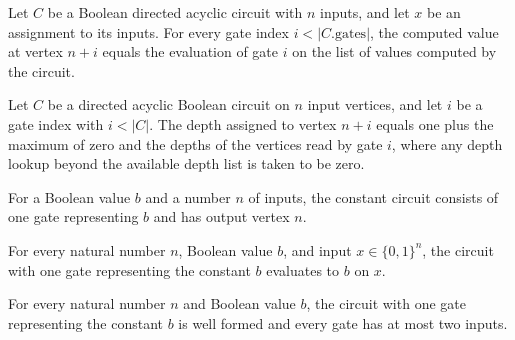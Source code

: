 \begin{theorem}
\label{BoolCircuit.DAGCircuit.values_getD_gate}
\leanok
{}
Let $C$ be a Boolean directed acyclic circuit with $n$ inputs, and let $x$ be an
assignment to its inputs. For every gate index $i<|C.\text{gates}|$, the computed value
at vertex $n+i$ equals the evaluation of gate $i$ on the list of values computed by the
circuit.
\end{theorem}

\begin{theorem}
\label{BoolCircuit.DAGCircuit.depthAt_gate}
\leanok
{}
Let $C$ be a directed acyclic Boolean circuit on $n$ input vertices, and let $i$ be a
gate index with $i<|C|$. The depth assigned to vertex $n+i$ equals one plus the maximum
of zero and the depths of the vertices read by gate $i$, where any depth lookup beyond
the available depth list is taken to be zero.
\end{theorem}

\begin{definition}
\label{BoolCircuit.constCircuit}
\leanok
{}
For a Boolean value $b$ and a number $n$ of inputs, the constant circuit consists of one
gate representing $b$ and has output vertex $n$.
\end{definition}

\begin{theorem}
\label{BoolCircuit.constCircuit_eval}
\leanok
{}
For every natural number $n$, Boolean value $b$, and input $x\in\{0,1\}^n$, the circuit
with one gate representing the constant $b$ evaluates to $b$ on $x$.
\end{theorem}

\begin{theorem}
\label{BoolCircuit.constCircuit_isFaninTwo}
\leanok
{}
For every natural number $n$ and Boolean value $b$, the circuit with one gate
representing the constant $b$ is well formed and every gate has at most two inputs.
\end{theorem}

